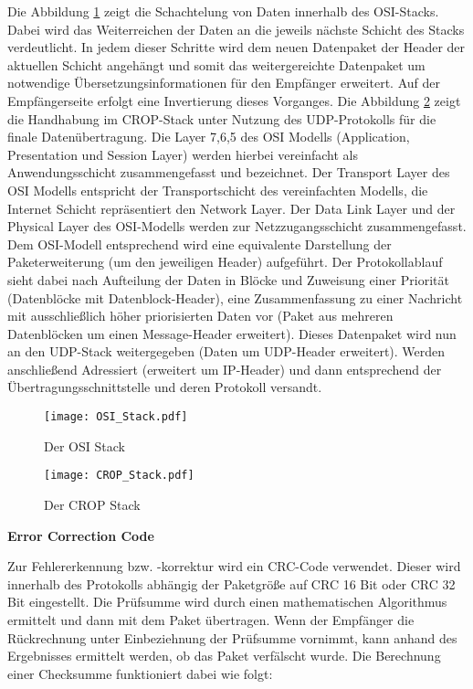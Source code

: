 Die Abbildung \ref{fig:OSI_Stack}  zeigt die Schachtelung von Daten
innerhalb des OSI-Stacks. Dabei wird das Weiterreichen der Daten an die jeweils n{\"a}chste
Schicht des Stacks verdeutlicht. In jedem dieser Schritte wird dem neuen
Datenpaket der Header der aktuellen Schicht angeh{\"a}ngt und somit das
weitergereichte Datenpaket um notwendige {\"U}bersetzungsinformationen f{\"u}r
den Empf{\"a}nger erweitert. Auf der Empf{\"a}ngerseite erfolgt eine Invertierung dieses
Vorganges. Die Abbildung \ref{fig:CROP_Stack} zeigt die Handhabung im CROP-Stack
unter Nutzung des UDP-Protokolls f{\"u}r die finale Daten{\"u}bertragung. Die Layer
7,6,5 des OSI Modells (Application, Presentation und Session Layer) werden
hierbei vereinfacht als Anwendungsschicht zusammengefasst und bezeichnet. Der
Transport Layer des OSI Modells entspricht der Transportschicht des
vereinfachten Modells, die Internet Schicht repr{\"a}sentiert den Network Layer.
Der Data Link Layer und der Physical Layer des OSI-Modells werden zur
Netzzugangsschicht zusammengefasst. Dem OSI-Modell entsprechend wird eine
equivalente Darstellung der Paketerweiterung (um den jeweiligen Header)
aufgef{\"u}hrt. Der Protokollablauf sieht dabei nach Aufteilung der Daten in Bl{\"o}cke
und Zuweisung einer Priorit{\"a}t (Datenbl{\"o}cke mit Datenblock-Header), eine
Zusammenfassung zu einer Nachricht mit ausschließlich höher priorisierten
Daten vor (Paket aus mehreren Datenbl{\"o}cken um einen Message-Header erweitert). Dieses Datenpaket
wird nun an den UDP-Stack weitergegeben (Daten um UDP-Header erweitert). Werden
anschlie{\ss}end Adressiert (erweitert um IP-Header) und dann entsprechend der
{\"U}bertragungsschnittstelle und deren Protokoll versandt. 

\begin{figure}[H]
\centering
\texttt{[image: OSI\_Stack.pdf]}
\caption{Der OSI Stack}
\label{fig:OSI_Stack}
\end{figure}

\begin{figure}[H]
\centering
\texttt{[image: CROP\_Stack.pdf]}
\caption{Der CROP Stack}
\label{fig:CROP_Stack}
\end{figure}

\textbf{Error Correction Code}

Zur Fehlererkennung bzw. -korrektur wird ein CRC-Code verwendet. Dieser wird
innerhalb des Protokolls abhängig der Paketgr{\"o}{\ss}e auf CRC 16 Bit oder
CRC 32 Bit eingestellt. Die Pr{\"u}fsumme wird durch einen mathematischen
Algorithmus ermittelt und dann mit dem Paket {\"u}bertragen. Wenn der
Empf{\"a}nger die R{\"u}ckrechnung unter Einbeziehnung der Pr{\"u}fsumme
vornimmt, kann anhand des Ergebnisses ermittelt werden, ob das Paket
verf{\"a}lscht wurde. Die Berechnung einer Checksumme funktioniert dabei wie
folgt:

